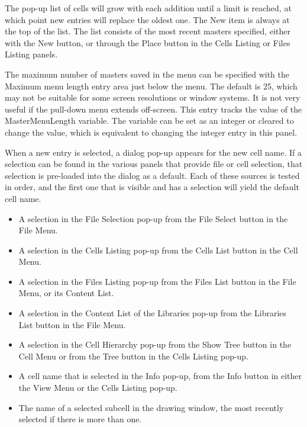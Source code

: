 The pop-up list of cells will grow with each addition until a limit is
reached, at which point new entries will replace the oldest one.  The
{\cb New} item is always at the top of the list.  The list consists of
the most recent masters specified, either with the {\cb New} button,
or through the {\cb Place} button in the {\cb Cells Listing} or {\cb
Files Listing} panels.

The maximum number of masters saved in the menu can be specified with
the {\cb Maximum menu length} entry area just below the menu.  The
default is 25, which may not be suitable for some screen resolutions
or window systems.  It is not very useful if the pull-down menu
extends off-screen.  This entry tracks the value of the {\et
MasterMenuLength} variable.  The variable can be set as an integer or
cleared to change the value, which is equivalent to changing the
integer entry in this panel.

When a new entry is selected, a dialog pop-up appears for the new cell
name.  If a selection can be found in the various panels that provide
file or cell selection, that selection is pre-loaded into the dialog
as a default.  Each of these sources is tested in order, and the first
one that is visible and has a selection will yield the default cell
name.

\begin{itemize}
\item{A selection in the {\cb File Selection} pop-up from the {\cb
 File Select} button in the {\cb File Menu}.}
\item{A selection in the {\cb Cells Listing} pop-up from the {\cb
 Cells List} button in the {\cb Cell Menu}.}
\item{A selection in the {\cb Files Listing} pop-up from the {\cb Files
 List} button in the {\cb File Menu}, or its {\cb Content List}.}
\item{A selection in the {\cb Content List} of the
 {\cb Libraries} pop-up from the {\cb Libraries List} button
 in the {\cb File Menu}.}
\item{A selection in the {\cb Cell Hierarchy} pop-up from the {\cb
 Show Tree} button in the {\cb Cell Menu} or from the {\cb Tree}
 button in the {\cb Cells Listing} pop-up.}
\item{A cell name that is selected in the {\cb Info} pop-up, from
 the {\cb Info} button in either the {\cb View Menu} or the {\cb
 Cells Listing} pop-up.}
\item{The name of a selected subcell in the drawing window, the most
 recently selected if there is more than one.}
\end{itemize}

